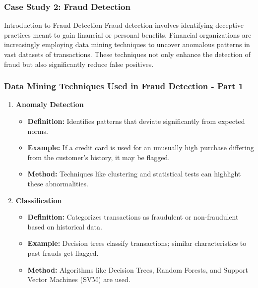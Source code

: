 \documentclass[aspectratio=169]{beamer}
\begin{document}
\begin{frame}[fragile]
    \frametitle{Case Study 2: Fraud Detection}
    \begin{block}{Introduction to Fraud Detection}
        Fraud detection involves identifying deceptive practices meant to gain financial or personal benefits. Financial organizations are increasingly employing data mining techniques to uncover anomalous patterns in vast datasets of transactions. 
        These techniques not only enhance the detection of fraud but also significantly reduce false positives.
    \end{block}
\end{frame}

\begin{frame}[fragile]
    \frametitle{Data Mining Techniques Used in Fraud Detection - Part 1}
    \begin{enumerate}
        \item \textbf{Anomaly Detection}
            \begin{itemize}
                \item \textbf{Definition:} Identifies patterns that deviate significantly from expected norms.
                \item \textbf{Example:} If a credit card is used for an unusually high purchase differing from the customer's history, it may be flagged.
                \item \textbf{Method:} Techniques like clustering and statistical tests can highlight these abnormalities.
            \end{itemize}
        
        \item \textbf{Classification}
            \begin{itemize}
                \item \textbf{Definition:} Categorizes transactions as fraudulent or non-fraudulent based on historical data.
                \item \textbf{Example:} Decision trees classify transactions; similar characteristics to past frauds get flagged.
                \item \textbf{Method:} Algorithms like Decision Trees, Random Forests, and Support Vector Machines (SVM) are used.
            \end{itemize}
    \end{enumerate}
\end{frame}
\end{document}
